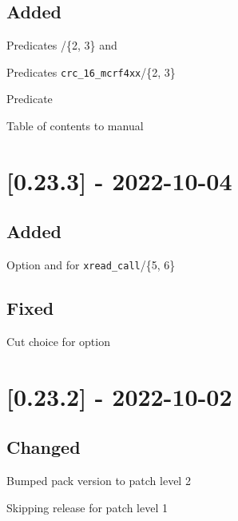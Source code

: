 \subsection{Added}

\begin{shortlist}
    \item Predicates /\{2, 3\} and 
    \item Predicates \verb$crc_16_mcrf4xx$/\{2, 3\}
    \item Predicate 
    \item Table of contents to manual
\end{shortlist}

\section{[0.23.3] - 2022-10-04}

\subsection{Added}

\begin{shortlist}
    \item Option  and  for \verb$xread_call$/\{5, 6\}
\end{shortlist}

\subsection{Fixed}

\begin{shortlist}
    \item Cut choice for  option
\end{shortlist}

\section{[0.23.2] - 2022-10-02}

\subsection{Changed}

\begin{shortlist}
    \item Bumped pack version to patch level 2
    \item Skipping release for patch level 1
\end{shortlist}

